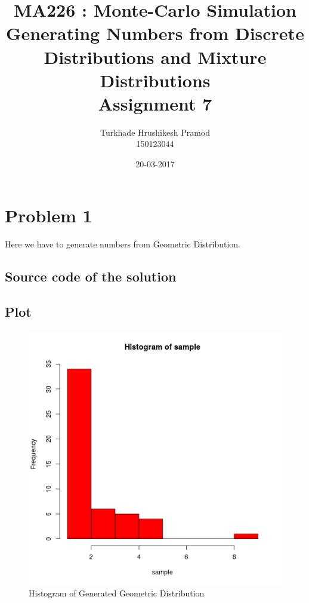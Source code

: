 \documentclass{article}
\title{%
	MA226 : Monte-Carlo Simulation\\
	 Generating Numbers from Discrete Distributions and Mixture Distributions\\
	 \large Assignment 7}
\date{20-03-2017}
\author{%
	Turkhade Hrushikesh Pramod\\
	150123044	}
\begin{document}
	\maketitle
	
	\newpage
	
	\section{Problem 1}
	\paragraph{}
		Here we have to generate numbers from Geometric Distribution.
		
	\subsection{Source code of the solution}
		
	
	\subsection{Plot}
			\begin{figure}
  				\includegraphics[width=\linewidth]{pic/que1.png}
 			 	\caption{Histogram of Generated Geometric Distribution}
  			\label{fig:hist1}
		\end{figure}
	\clearpage		
	
\end{document}
